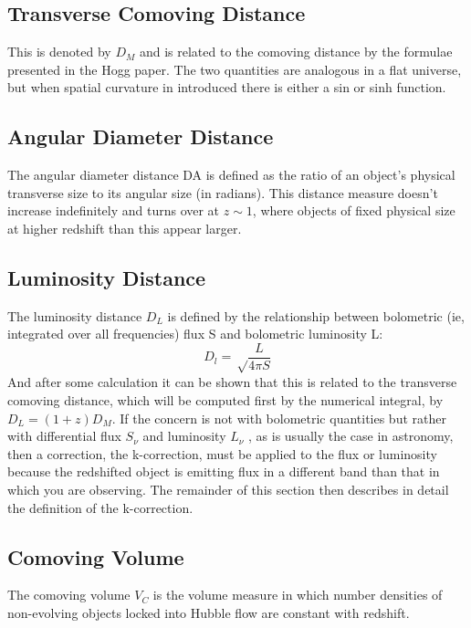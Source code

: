 \documentclass{literature}
\begin{document}
\subsection{Transverse Comoving Distance}\label{subs:transverse_comoving_distance}
This is denoted by $D_{M}$ and is related to the comoving distance by the formulae presented in the Hogg paper. The two quantities are analogous in a flat universe, but when spatial curvature in introduced there is either a sin or sinh function. 
\subsection{Angular Diameter Distance}\label{subs:Angular Diameter distance}
The angular diameter distance DA is defined as the ratio of an object’s physical transverse size to its angular size (in radians). This distance measure doesn't increase indefinitely and turns over at $z \sim 1$, where objects of fixed physical size at higher redshift than this appear larger.
\subsection{Luminosity Distance}\label{subs:Luminosity distance}
The luminosity distance $D_{L}$ is defined by the relationship between bolometric (ie, integrated over all frequencies) flux S and bolometric luminosity L:
\begin{equation}
	D_{l} = \sqrt \frac{L}{4\pi S}
\end{equation}
And after some calculation it can be shown that this is related to the transverse comoving distance, which will be computed first by the numerical integral, by $D_{L} = (1 + z)D_{M}$. If the concern is not with bolometric quantities but rather with differential flux $S_{\nu}$ and luminosity $L_{\nu}$ , as is usually the case in astronomy, then a correction, the k-correction, must be applied to the flux or luminosity because the redshifted object is emitting flux in a different band than that in which you are observing. The remainder of this section then describes in detail the definition of the k-correction.

\subsection{Comoving Volume}\label{subs:Comoving Volume}
The comoving volume $V_{C}$ is the volume measure in which number densities of non-evolving objects locked into Hubble flow are constant with redshift.
\end{document}
